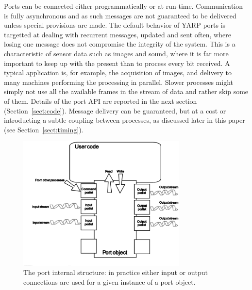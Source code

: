 \noindent
%
Ports can be connected either programmatically or at run-time.
%
%
%
Communication is fully asynchronous and as such messages are not guaranteed to be 
delivered unless special provisions are made. The default behavior of YARP ports 
is targetted at dealing with recurrent messages, updated and sent often, where losing 
one message does not compromise the integrity of the system. This is a characteristic
of sensor data such as images and sound, where it is far more important to keep
up with the present than to process every bit received.  
%
%
A typical application is, for example, the acquisition of images, and delivery to many 
machines performing the processing in parallel. Slower processes might simply not
use all the available frames in the stream of data and rather skip some of them.
%
Details of the port API are reported in the next section (Section~\ref{sect:code}).
Message delivery can be guaranteed, but at a cost or introducting a subtle coupling
between processes, as discussed later in this paper (see Section~\ref{sect:timing}). 


\begin{figure}
	\centering
		\includegraphics[width=8.5cm]{port.eps}
	\caption{The port internal structure: in practice either input or output connections
	are used for a given instance of a port object.}
	\label{fig:port}
\end{figure}


